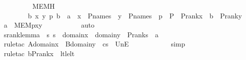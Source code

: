 \begin{isabellebody}
\isanewline
\ \ \ \ \ \ \isamarkupfalse%
\ \isamarkupfalse%
\ MEMH\ {\isacharcolon}{\kern0pt}\ \isanewline
\ \ \ \ \ \ \ \ {\isachardoublequoteopen}{\isasymAnd}b\ x\ y\ p{\isachardot}{\kern0pt}\ b\ {\isasymin}\ a\ {\isasymLongrightarrow}\ x\ {\isasymin}\ P{\isacharunderscore}{\kern0pt}names\ {\isasymLongrightarrow}\ y\ {\isasymin}\ P{\isacharunderscore}{\kern0pt}names\ {\isasymLongrightarrow}\ p\ {\isasymin}\ P\ {\isasymLongrightarrow}\ P{\isacharunderscore}{\kern0pt}rank{\isacharparenleft}{\kern0pt}x{\isacharparenright}{\kern0pt}\ {\isasymle}\ b\ {\isasymLongrightarrow}\ P{\isacharunderscore}{\kern0pt}rank{\isacharparenleft}{\kern0pt}y{\isacharparenright}{\kern0pt}\ {\isasymle}\ a\ {\isasymLongrightarrow}\ MEM{\isacharparenleft}{\kern0pt}p{\isacharcomma}{\kern0pt}x{\isacharcomma}{\kern0pt}y{\isacharparenright}{\kern0pt}{\isachardoublequoteclose}\ \isanewline
\ \ \ \ \ \ \ \ \isamarkupfalse%
\ auto\ \isanewline
\isanewline
\ \ \ \ \ \ \isamarkupfalse%
\ srank{\isacharunderscore}{\kern0pt}lemma\ {\isacharcolon}{\kern0pt}\ {\isachardoublequoteopen}{\isasymAnd}s{\isachardot}{\kern0pt}\ s\ {\isasymin}\ domain{\isacharparenleft}{\kern0pt}x{\isacharparenright}{\kern0pt}\ {\isasymunion}\ domain{\isacharparenleft}{\kern0pt}y{\isacharparenright}{\kern0pt}\ {\isasymLongrightarrow}\ P{\isacharunderscore}{\kern0pt}rank{\isacharparenleft}{\kern0pt}s{\isacharparenright}{\kern0pt}\ {\isacharless}{\kern0pt}\ a{\isachardoublequoteclose}\ \isanewline
\ \ \ \ \ \ \ \ \isamarkupfalse%
\ {\isacharparenleft}{\kern0pt}rule{\isacharunderscore}{\kern0pt}tac\ A{\isacharequal}{\kern0pt}{\isachardoublequoteopen}domain{\isacharparenleft}{\kern0pt}x{\isacharparenright}{\kern0pt}{\isachardoublequoteclose}\ \ B{\isacharequal}{\kern0pt}{\isachardoublequoteopen}domain{\isacharparenleft}{\kern0pt}y{\isacharparenright}{\kern0pt}{\isachardoublequoteclose}\ \ c{\isacharequal}{\kern0pt}s\ \ UnE{\isacharparenright}{\kern0pt}\isanewline
\ \ \ \ \ \ \ \ \ \ \isamarkupfalse%
\ simp\ \isanewline
\ \ \ \ \ \ \ \ \ \isamarkupfalse%
\ {\isacharparenleft}{\kern0pt}rule{\isacharunderscore}{\kern0pt}tac\ b{\isacharequal}{\kern0pt}{\isachardoublequoteopen}P{\isacharunderscore}{\kern0pt}rank{\isacharparenleft}{\kern0pt}x{\isacharparenright}{\kern0pt}{\isachardoublequoteclose}\ \ lt{\isacharunderscore}{\kern0pt}le{\isacharunderscore}{\kern0pt}lt{\isacharparenright}{\kern0pt}\ \isanewline
\ \ \ \ \ \ \ \ \ \ \isamarkupfalse%

\end{isabellebody}
